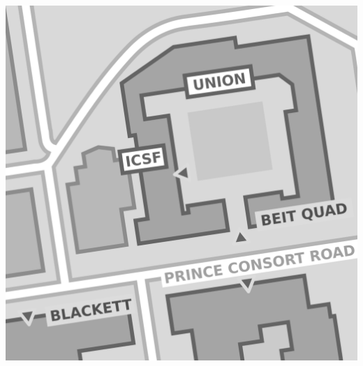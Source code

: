 
\hspace{\fill}%
\begin{minipage}{\textwidth}
\includegraphics[width=\textwidth]{img/info/map.png}

\vspace{2em}


\end{minipage}
